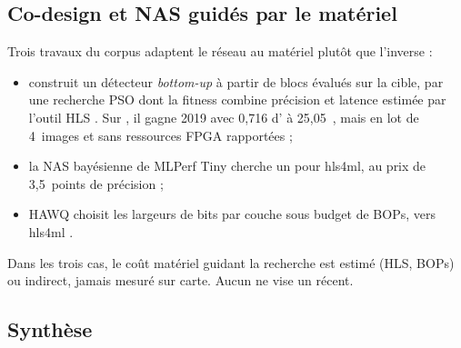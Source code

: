\subsection{Co-design et NAS guidés par le matériel}

Trois travaux du corpus adaptent le réseau au matériel plutôt que l'inverse :
\begin{itemize}
  \item {} \citep{arxiv-1909.09709-skynet-hardware-efficient-method-object}\pp{}
    construit un détecteur \emph{bottom-up} à partir de blocs évalués sur la cible, par
    une recherche PSO dont la fitness combine précision et latence estimée par l'outil HLS
    . Sur , il gagne  2019 avec 0,716 d' à 25,05\,
    , mais en lot de 4~images et sans ressources FPGA rapportées ;
  \item la NAS bayésienne de MLPerf Tiny cherche un  pour hls4ml, au prix de
    3,5~points de précision \citep[§3.1]{arxiv-2206.11791-open-source-fpga-ml-codesign}\pp{} ;
  \item HAWQ choisit les largeurs de bits par couche sous budget de BOPs, vers hls4ml
    \citep[Table~2]{2024-campos-end-end-codesign-hessian-aware}.
\end{itemize}
Dans les trois cas, le coût matériel guidant la recherche est estimé (HLS, BOPs) ou
indirect, jamais mesuré sur carte. Aucun ne vise un  récent.

\subsection{Synthèse}

